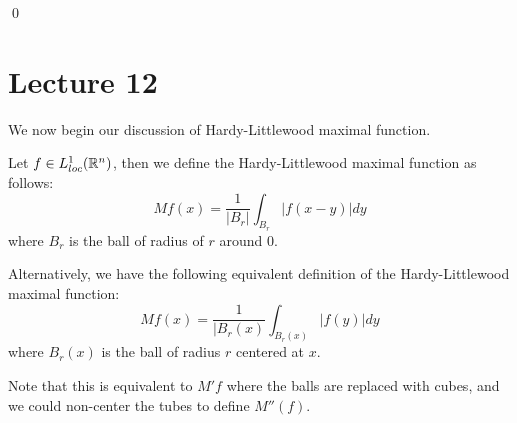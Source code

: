 \qed



\section{Lecture 12}
We now begin our discussion of Hardy-Littlewood maximal function.


\begin{definition}
    Let $f\in L_{loc}^1(\mathbb{R}^n)$, then we define the Hardy-Littlewood maximal function as follows:
    \begin{equation*}
        Mf(x)=\frac{1}{|B_r|}\int_{B_r}|f(x-y)|dy
    \end{equation*}
    where $B_r$ is the ball of radius of $r$ around 0. 

    Alternatively, we have the following equivalent definition of the Hardy-Littlewood maximal function:
    \begin{equation*}
        Mf(x)=\frac{1}{|B_r(x)}\int_{B_r(x)}|f(y)|dy
    \end{equation*}
    where $B_r(x)$ is the ball of radius $r$ centered at $x$.
\end{definition}
Note that this is equivalent to $M'f$ where the balls are replaced with cubes, and we could non-center the tubes to define $M''(f)$.

